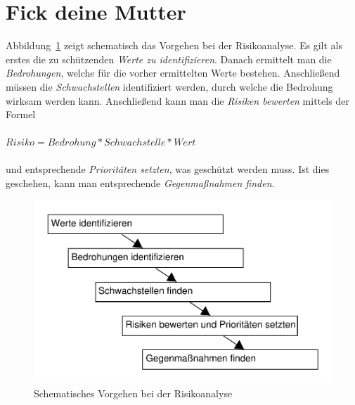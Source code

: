 \section{Fick deine Mutter}

Abbildung~\ref{5analysestufen} zeigt schematisch das Vorgehen bei der Risikoanalyse. Es gilt als erstes die zu schützenden \textit{Werte zu identifizieren}. Danach ermittelt man die \textit{Bedrohungen}, welche für die vorher ermittelten Werte bestehen. Anschließend müssen die \textit{Schwachstellen} identifiziert werden, durch welche die Bedrohung wirksam werden kann. Anschließend kann man die \textit{Risiken bewerten} mittels der Formel
\\\\
$ Risiko = Bedrohung * Schwachstelle * Wert $
\\\\
und entsprechende \textit{Prioritäten setzten}, was geschützt werden muss. Ist dies geschehen, kann man entsprechende \textit{Gegenmaßnahmen finden}.



\begin{figure}[h]
\includegraphics[scale=0.8]{images/5analysestufen.pdf}
\caption{Schematisches Vorgehen bei der Risikoanalyse}
\label{5analysestufen}
\end{figure}

